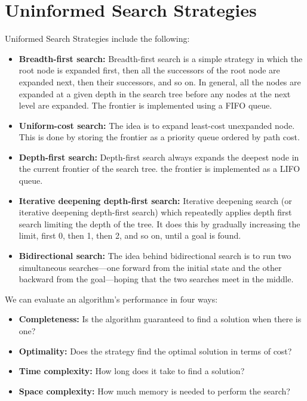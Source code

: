 \section{Uninformed Search Strategies}
Uniformed Search Strategies include the following:
\begin{itemize}
    \item \textbf{Breadth-first search:} Breadth-first search is a simple strategy in which the root node is expanded first, then all the successors of the root node are expanded next, then their successors, and so on. In general, all the nodes are expanded at a given depth in the search tree before any nodes at the next level are expanded. The frontier is implemented using a FIFO queue.

    \item \textbf{Uniform-cost search:} The idea is to expand least-cost unexpanded node. This is done by storing the frontier as a priority queue ordered by path cost.

    \item \textbf{Depth-first search:} Depth-first search always expands the deepest node in the current frontier of the search tree. the frontier is implemented as a LIFO queue.

    \item \textbf{Iterative deepening depth-first search:} Iterative deepening search (or iterative deepening depth-first search) which repeatedly applies depth first search limiting the depth of the tree. It does this by gradually increasing the limit, first 0, then 1, then 2, and so on, until a goal is found.

    \item \textbf{Bidirectional search:} The idea behind bidirectional search is to run two simultaneous searches—one forward from the initial state and the other backward from the goal—hoping that the two searches meet in the middle.

\end{itemize}
We can evaluate an algorithm’s performance in four ways:
\begin{itemize}
    \item \textbf{Completeness:} Is the algorithm guaranteed to find a solution when there is one?

    \item \textbf{Optimality:} Does the strategy find the optimal solution in terms of cost?

    \item \textbf{Time complexity:} How long does it take to find a solution?

    \item \textbf{Space complexity:} How much memory is needed to perform the search?
\end{itemize}
